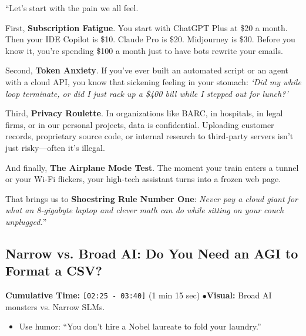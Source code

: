 \documentclass[11pt,a4paper]{article}
\begin{document}
\begin{speechbox}
``Let's start with the pain we all feel.

First, \textbf{Subscription Fatigue}. You start with ChatGPT Plus at \$20 a month. Then your IDE Copilot is \$10. Claude Pro is \$20. Midjourney is \$30. Before you know it, you're spending \$100 a month just to have bots rewrite your emails.

Second, \textbf{Token Anxiety}. If you've ever built an automated script or an agent with a cloud API, you know that sickening feeling in your stomach: \textit{`Did my while loop terminate, or did I just rack up a \$400 bill while I stepped out for lunch?'}

Third, \textbf{Privacy Roulette}. In organizations like BARC, in hospitals, in legal firms, or in our personal projects, data is confidential. Uploading customer records, proprietary source code, or internal research to third-party servers isn't just risky---often it's illegal.

And finally, \textbf{The Airplane Mode Test}. The moment your train enters a tunnel or your Wi-Fi flickers, your high-tech assistant turns into a frozen web page.

That brings us to \textbf{Shoestring Rule Number One}: \textit{Never pay a cloud giant for what an 8-gigabyte laptop and clever math can do while sitting on your couch unplugged.}''
\end{speechbox}

\subsection{Narrow vs. Broad AI: Do You Need an AGI to Format a CSV?}
\begin{directionbox}
    \textbf{Cumulative Time:} \texttt{[02:25 - 03:40]} (1 min 15 sec) \quad$\bullet$\quad \textbf{Visual:} Broad AI monsters vs. Narrow SLMs.
    \begin{itemize}
        \item Use humor: ``You don't hire a Nobel laureate to fold your laundry.''
    \end{itemize}
\end{directionbox}
\end{document}
